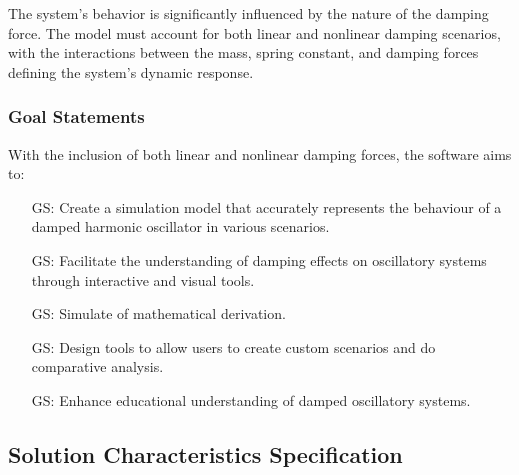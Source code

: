 \documentclass[12pt]{article}
\newcounter{goalnum} %
\begin{document}
 
The system's behavior is significantly influenced by the nature of the damping 
force. The model must account for both linear and nonlinear damping scenarios, 
with the interactions between the mass, spring constant, and damping forces 
defining the system's dynamic response.



\subsubsection{Goal Statements}

With the inclusion of both linear and nonlinear damping forces, the software aims 
to:

\begin{itemize}

  \item[GS\refstepcounter{goalnum}\thegoalnum \label{G_meaningfulLabel1}:] Create a simulation model that accurately represents the 
  behaviour of a damped harmonic oscillator in various scenarios.
  \item[GS\refstepcounter{goalnum}\thegoalnum \label{G_meaningfulLabel2}:] Facilitate the understanding of damping effects on 
  oscillatory systems through interactive and visual tools.
  \item[GS\refstepcounter{goalnum}\thegoalnum \label{G_meaningfulLabel3}:] Simulate of mathematical derivation.
  \item[GS\refstepcounter{goalnum}\thegoalnum \label{G_meaningfulLabel4}:] Design tools to allow users to create custom scenarios and 
  do comparative analysis. 
  \item[GS\refstepcounter{goalnum}\thegoalnum \label{G_meaningfulLabel5}:] Enhance educational understanding of damped oscillatory 
  systems.
  
\end{itemize}

\subsection{Solution Characteristics Specification}
\end{document}
